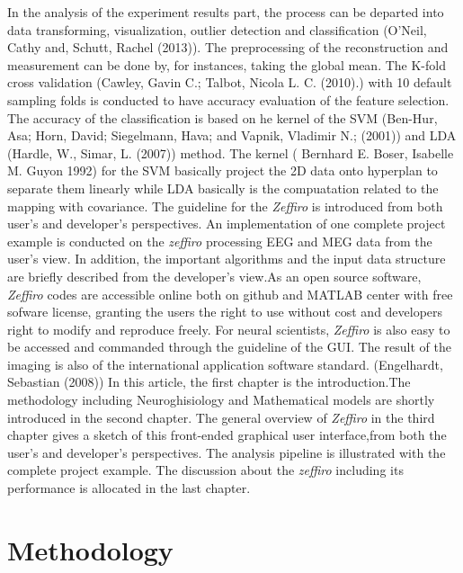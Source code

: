 \documentclass[5p]{elsarticle}
\begin{document}
\begin{frontmatter}
{ In the analysis of the experiment results part, the process can be departed into data transforming, visualization, outlier detection and classification (O'Neil, Cathy and, Schutt, Rachel (2013)). The preprocessing of the reconstruction and measurement can be done by, for instances, taking the global mean. The K-fold cross validation  (Cawley, Gavin C.; Talbot, Nicola L. C. (2010).) with 10 default sampling folds\cite{11} is conducted to have accuracy evaluation of the feature selection. The accuracy of the classification is based on he kernel of the SVM (Ben-Hur, Asa; Horn, David; Siegelmann, Hava; and Vapnik, Vladimir N.; (2001)) and LDA (Hardle, W., Simar, L. (2007)) method. The kernel ( Bernhard E. Boser, Isabelle M. Guyon 1992) for the SVM \cite{12} basically project the 2D data onto hyperplan to separate them linearly while LDA \cite{13} basically is the compuatation related to the mapping with covariance. 
 The guideline for the {\em Zeffiro} is introduced from both user's and developer's perspectives. An implementation of one complete project example is conducted on the {\em zeffiro} processing EEG and MEG data from the user's view. In addition, the important algorithms and the input data structure are briefly described from the developer's view.As an open source software,  {\em Zeffiro} codes are accessible online both on github and MATLAB center with free sofware license, granting the users the right to use without cost and developers right to modify and reproduce freely. For neural scientists, {\em Zeffiro} is also easy to be accessed and commanded through the guideline of the GUI. The result of the imaging is also of the international application software standard. (Engelhardt, Sebastian (2008))
 In this article, the first chapter is the introduction.The methodology including Neuroghisiology and Mathematical models are shortly introduced in the second chapter. The general overview of {\em Zeffiro} in the third chapter gives a sketch of this front-ended graphical user interface,from both the user's and developer's perspectives. The analysis pipeline is illustrated with the complete project example. The discussion about the {\em zeffiro} including its performance is allocated in the last chapter.} 
 
\section{Methodology}


\end{frontmatter}
\end{document}
